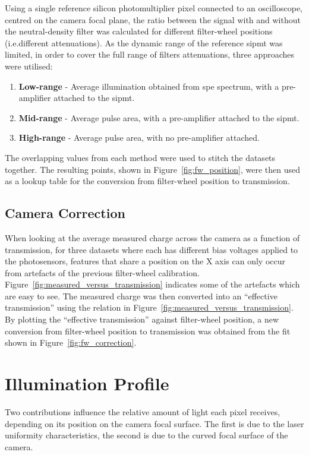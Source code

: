 Using a single reference silicon photomultiplier pixel connected to an oscilloscope, centred on the camera focal plane, the ratio between the signal with and without the neutral-density filter was calculated for different filter-wheel positions (i.e.\@ different attenuations). As the dynamic range of the reference \gls{sipmt} was limited, in order to cover the full range of filters attenuations, three approaches were utilised:
\begin{enumerate}
\item \textbf{Low-range} - Average illumination obtained from \gls{spe} spectrum, with a pre-amplifier attached to the \gls{sipmt}.
\item \textbf{Mid-range} - Average pulse area, with a pre-amplifier attached to the \gls{sipmt}.
\item \textbf{High-range} - Average pulse area, with no pre-amplifier attached.
\end{enumerate}
The overlapping values from each method were used to stitch the datasets together. The resulting points, shown in Figure~\ref{fig:fw_position}, were then used as a lookup table for the conversion from filter-wheel position to transmission.

\subsection{Camera Correction}

When looking at the average measured charge across the camera as a function of transmission, for three datasets where each has different bias voltages applied to the photosensors, features that share a position on the X axis can only occur from artefacts of the previous filter-wheel calibration. Figure~\ref{fig:measured_versus_transmission} indicates some of the artefacts which are easy to see. The measured charge was then converted into an ``effective transmission'' using the relation in Figure~\ref{fig:measured_versus_transmission}. By plotting the ``effective transmission'' against filter-wheel position, a new conversion from filter-wheel position to transmission was obtained from the fit shown in Figure~\ref{fig:fw_correction}.

\section{Illumination Profile} \label{section:illumination_profile}

Two contributions influence the relative amount of light each pixel receives, depending on its position on the camera focal surface. The first is due to the laser uniformity characteristics, the second is due to the curved focal surface of the camera.

